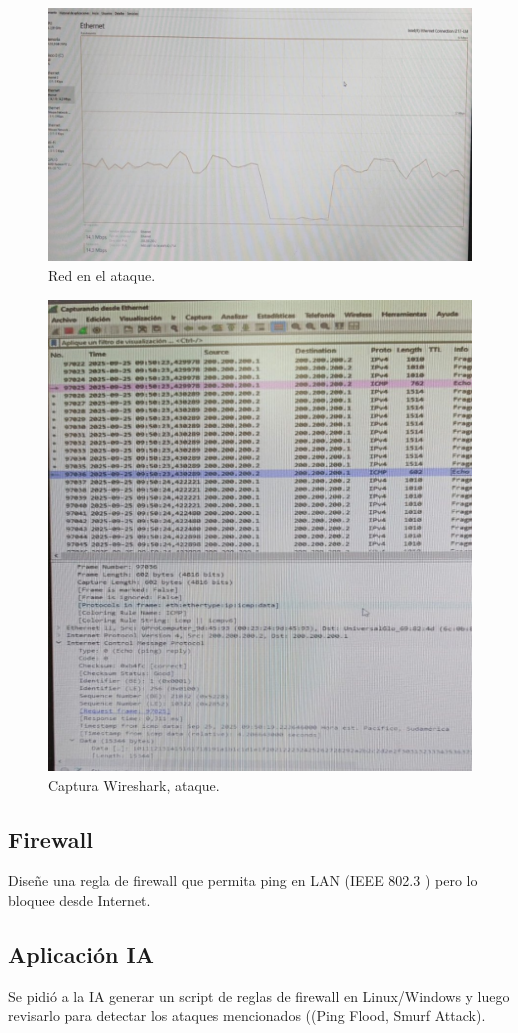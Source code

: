 \begin{figure}[H]
    \centering
    \includegraphics[width=\columnwidth]{punto2/images/5_red_ataque.jpeg}
    \caption{Red en el ataque.}
\end{figure}
\begin{figure}[H]
    \centering
    \includegraphics[width=0.75\columnwidth]{punto2/images/6_ws_ataque.jpeg}
    \caption{Captura Wireshark, ataque.}
\end{figure}




\subsection{Firewall}
Diseñe una regla de firewall que permita ping en LAN (IEEE 802.3 ) pero lo bloquee desde Internet.
%

\subsection{Aplicación IA}

Se pidió a la IA generar un script de reglas de firewall en Linux/Windows y luego revisarlo para detectar los ataques mencionados ((Ping Flood, Smurf Attack).

